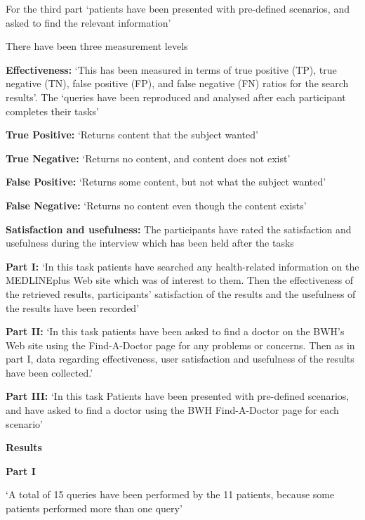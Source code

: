 \documentclass[]{article}
\begin{document}
For the third part ‘patients have been presented with pre-defined scenarios, and asked to find the relevant information’

There have been three measurement levels

\textbf{Effectiveness:} ‘This has been measured in terms of true positive (TP), true negative (TN), false positive (FP), and false negative (FN) ratios for the search results’. The ‘queries have been reproduced and analysed after each participant completes their tasks’

\textbf{True Positive:} ‘Returns content that the subject wanted’

\textbf{True Negative:} ‘Returns no content, and content does not exist’

\textbf{False Positive:} ‘Returns some content, but not what the subject wanted’

\textbf{False Negative:} ‘Returns no content even though the content exists’

\textbf{Satisfaction and usefulness:} The participants have rated the satisfaction and usefulness during the interview which has been held after the tasks  

\textbf{Part I:} ‘In this task patients have searched any health-related information on the MEDLINEplus Web site which was of interest to them. Then the effectiveness of the retrieved results, participants’ satisfaction of the results and the usefulness of the results have been recorded’

\textbf{Part II:} ‘In this task patients have been asked to find a doctor on the BWH's Web site using the Find-A-Doctor page for any problems or concerns. Then as in part I, data regarding effectiveness, user satisfaction and usefulness of the results have been collected.’

\textbf{Part III:} ‘In this task Patients have been presented with pre-defined scenarios, and have asked to find a doctor using the BWH Find-A-Doctor page for each scenario’

\textbf{Results}

\textbf{Part I}

‘A total of 15 queries have been performed by the 11 patients, because some patients performed more than one query’
\end{document}
